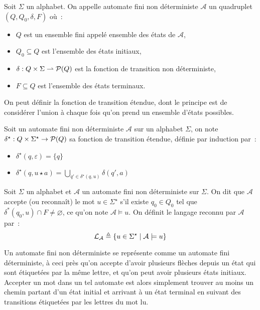 \begin{definition}
  Soit $\Sigma$ un alphabet. On appelle automate fini non déterministe
  $\mathcal A$ un quadruplet $(Q,Q_0,\delta,F)$ où~:
  \begin{itemize}
  \item $Q$ est un ensemble fini appelé ensemble des états de $\mathcal A$,
  \item $Q_0\subseteq Q$ est l'ensemble des états initiaux,
  \item $\delta : Q\times \Sigma \rightharpoonup \mathcal{P}(Q)$ est la fonction de
    transition non déterministe,
  \item $F\subseteq Q$ est l'ensemble des états terminaux.
  \end{itemize}
\end{definition}

On peut définir la fonction de transition étendue, dont le principe est de
considérer l'union à chaque fois qu'on prend un ensemble d'états possibles.

\begin{definition}
  Soit un automate fini non déterministe $\mathcal A$ sur un alphabet $\Sigma$,
  on note $\delta^\star : Q \times \Sigma^\star \to \mathcal{P}(Q)$ sa fonction de
  transition étendue, définie par induction par~:
  \begin{itemize}
  \item $\delta^\star(q,\varepsilon) = \{q\}$
  \item $\displaystyle\delta^\star(q,u\star a) =
    \bigcup_{q' \in \delta^\star(q,u)} \delta(q',a)$
  \end{itemize}
\end{definition}

\begin{definition}
  Soit $\Sigma$ un alphabet et $\mathcal A$ un automate fini non déterministe
  sur $\Sigma$. On dit que $\mathcal A$ accepte (ou reconnaît) le mot
  $u \in \Sigma^\star$ s'il existe $q_0 \in Q_0$ tel que
  $\delta^*(q_0,u) \cap F\neq\varnothing$, ce qu'on note $\mathcal A \models u$.
  On définit le langage reconnu par $\mathcal A$ par~:
  \[\mathcal L_\mathcal A\triangleq \{u \in \Sigma^\star \mid \mathcal A \models u\}\]
\end{definition}

Un automate fini non déterministe se représente comme un automate fini
déterministe, à ceci près qu'on accepte d'avoir plusieurs flèches depuis un
état qui sont étiquetées par la même lettre, et qu'on peut avoir plusieurs
états initiaux. Accepter un mot dans un tel automate est alors simplement
trouver au moins un chemin partant d'un état initial et arrivant à un état
terminal en suivant des transitions étiquetées par les lettres du mot lu.

